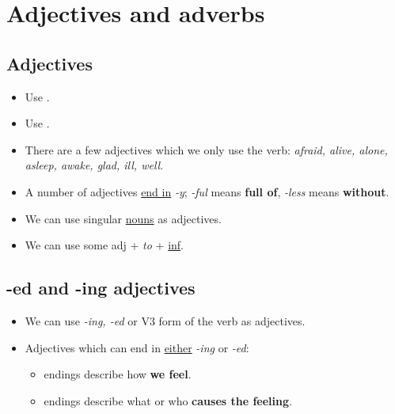 \section{Adjectives and adverbs}

\subsection{Adjectives}
\begin{itemize}
    \item Use .
    \item Use .
    \item[\doot] There are a few adjectives which we only use  the verb:
    \textit{afraid, alive, alone, asleep, awake, glad, ill, well}.
    \item A number of adjectives \underline{end in} \textit{-y}; \textit{-ful} means \textbf{full of},
    \textit{-less} means \textbf{without}.
    \item[\doot] We can use singular \underline{nouns} as adjectives.
    \item[\doot] We can use some adj + \textit{to} + \underline{inf}.
\end{itemize}

\subsection{-ed and -ing adjectives}
\begin{itemize}
    \item We can use \textit{-ing, -ed} or V3 form of the verb as adjectives.
    \item Adjectives which can end in \underline{either} \textit{-ing} or \textit{-ed}:
    \begin{itemize}
        \item {} endings describe how \textbf{we feel}.
        \item {} endings describe what or who \textbf{causes the feeling}.
    \end{itemize}
\end{itemize}

